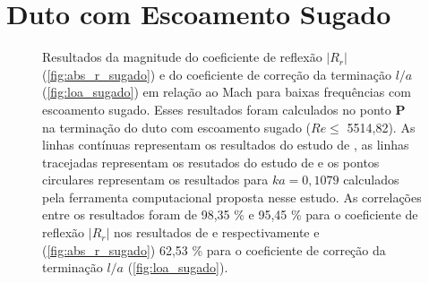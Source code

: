 \section{Duto com Escoamento Sugado}
\begin{figure}[ht!]
\begin{subfigure}{\scaleA \textwidth}
  
\end{subfigure}%
\begin{subfigure}{\scaleA \textwidth}
  
\end{subfigure}
\caption[Resultados de $|R_{r}|$ e $l/a$ em relação ao Mach para baixas frequências com escoamento sugado]{Resultados da magnitude do coeficiente de reflexão $|R_{r}|$ (\ref{fig:abs_r_sugado}) e do coeficiente de correção da terminação $l/a$ (\ref{fig:loa_sugado}) em relação ao Mach para baixas frequências com escoamento sugado. Esses resultados foram calculados no ponto $\textbf{P}$ na terminação do duto com escoamento sugado ($Re \leq$ 5514,82). As linhas contínuas representam os resultados do estudo de , as linhas tracejadas representam os resutados do estudo de  e os pontos circulares representam os resultados para $ka = 0,1079$ calculados pela ferramenta computacional proposta nesse estudo. As correlações entre os resultados foram de 98,35 \% e 95,45 \% para o coeficiente de reflexão $|R_{r}|$ nos resultados de  e  respectivamente e (\ref{fig:abs_r_sugado}) 62,53 \% para o coeficiente de correção da terminação $l/a$ (\ref{fig:loa_sugado}).}
\label{fig:resultados_sugado}
\end{figure}

\newpage
\begin{figure}[ht!]
  \centering
  
\end{figure}

\newpage
\begin{figure}[ht!]
  \centering
  
\end{figure}


\newpage
\begin{figure}[ht!]
\centering
  
\end{figure}

\newpage
\begin{figure}[ht!]
\centering
  
\end{figure}

\newpage
\begin{figure}[ht!]
\centering
  
\end{figure}

\newpage
\begin{figure}[ht!]
\centering
  
\end{figure}

